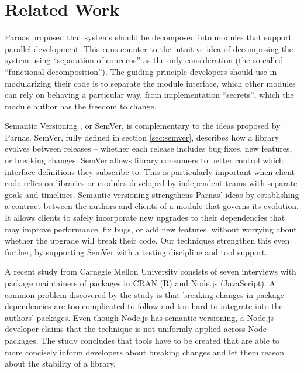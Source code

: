 \section{Related Work}

Parnas proposed \cite{Parnas} that systems should be decomposed into
modules that support parallel development. This runs counter to the
intuitive idea of decomposing the system using ``separation of
concerns'' as the only consideration (the so-called ``functional
decomposition''). The guiding principle developers should use in
modularizing their code is to separate the module interface, which
other modules can rely on behaving a particular way, from
implementation ``secrets'', which the module author has the freedom
to change. 

Semantic Versioning \cite{semver}, or SemVer, is complementary to the ideas
proposed by Parnas.
%
SemVer, fully defined in section \ref{sec:semver}, describes how a
library evolves between releases -- whether each release includes bug
fixes, new features, or breaking changes.
%
SemVer allows library consumers to better control which interface
definitions they subscribe to. This is particularly important when
client code relies on libraries or modules developed by independent
teams with separate goals and timelines.
%
Semantic versioning strengthens Parnas' ideas by establishing a
contract between the authors and clients of a module that governs its
evolution.
%
It allows clients to safely incorporate new upgrades to their
dependencies that may improve performance, fix bugs, or add new
features, without worrying about whether the upgrade will break their
code.
%
Our techniques strengthen this even further, by supporting SemVer with
a testing discipline and tool support.

A recent study from Carnegie Mellon University \cite{bogart15-break}
consists of seven interviews with package maintainers of packages in
CRAN (R) and Node.js (JavaScript). A common problem discovered by the
study is that breaking changes in package dependencies are too
complicated to follow and too hard to integrate into the authors'
packages. Even though Node.js has semantic versioning, a Node.js
developer claims that the technique is not uniformly applied across
Node packages. The study concludes that tools have to be created that
are able to more concisely inform developers about breaking changes
and let them reason about the stability of a library.

